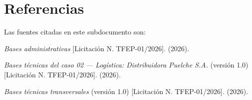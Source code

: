 \chapter*{Referencias}

Las fuentes citadas en este subdocumento son:

\begin{list}{}{\setlength{\leftmargin}{1.27cm}\setlength{\itemindent}{-1.27cm}\setlength{\itemsep}{0.5\baselineskip}}
\item \textit{Bases administrativas} [Licitación N.\textdegree{} TFEP-01/2026]. (2026).
\item \textit{Bases técnicas del caso 02 --- Logística: Distribuidora Puelche S.A.} (versión 1.0) [Licitación N.\textdegree{} TFEP-01/2026]. (2026).
\item \textit{Bases técnicas transversales} (versión 1.0) [Licitación N.\textdegree{} TFEP-01/2026]. (2026).
\end{list}
